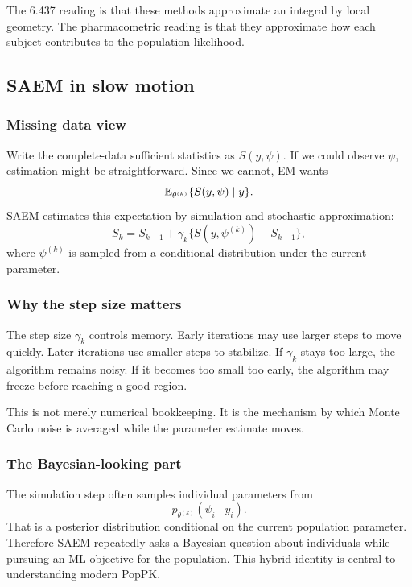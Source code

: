 The 6.437 reading is that these methods approximate an integral by local geometry.  The pharmacometric reading is that they approximate how each subject contributes to the population likelihood.

\subsection{SAEM in slow motion}

\subsubsection*{Missing data view}

Write the complete-data sufficient statistics as \(S(y,\psi)\).  If we could observe \(\psi\), estimation might be straightforward.  Since we cannot, EM wants
\[
  \mathbb{E}_{\theta^{(k)}}\{S(y,\psi)\mid y\}.
\]
SAEM estimates this expectation by simulation and stochastic approximation:
\[
  S_k=S_{k-1}+\gamma_k\{S(y,\psi^{(k)})-S_{k-1}\},
\]
where \(\psi^{(k)}\) is sampled from a conditional distribution under the current parameter.

\subsubsection*{Why the step size matters}

The step size \(\gamma_k\) controls memory.  Early iterations may use larger steps to move quickly.  Later iterations use smaller steps to stabilize.  If \(\gamma_k\) stays too large, the algorithm remains noisy.  If it becomes too small too early, the algorithm may freeze before reaching a good region.

This is not merely numerical bookkeeping.  It is the mechanism by which Monte Carlo noise is averaged while the parameter estimate moves.

\subsubsection*{The Bayesian-looking part}

The simulation step often samples individual parameters from
\[
  p_{\theta^{(k)}}(\psi_i\mid y_i).
\]
That is a posterior distribution conditional on the current population parameter.  Therefore SAEM repeatedly asks a Bayesian question about individuals while pursuing an ML objective for the population.  This hybrid identity is central to understanding modern PopPK.

